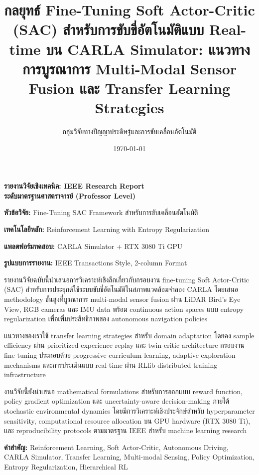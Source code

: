 \documentclass[10pt,a4paper,twocolumn]{article}
\title{\textbf{กลยุทธ์ Fine-Tuning Soft Actor-Critic (SAC) สำหรับการขับขี่อัตโนมัติแบบ Real-time บน CARLA Simulator: แนวทางการบูรณาการ Multi-Modal Sensor Fusion และ Transfer Learning Strategies}}
\author{กลุ่มวิจัยทางปัญญาประดิษฐ์และการขับเคลื่อนอัตโนมัติ}
\date{\today}
\begin{document}
\maketitle

\thispagestyle{empty}

\begin{center}
    \vspace{2cm}
    \textbf{\large รายงานวิจัยเชิงเทคนิค: IEEE Research Report} \\
    \vspace{1cm}
    \textbf{ระดับมาตรฐานศาสตราจารย์ (Professor Level)} \\
    \vspace{0.5cm}
    
    \begin{minipage}{0.48\textwidth}
        \textbf{หัวข้อวิจัย:} Fine-Tuning SAC Framework สำหรับการขับเคลื่อนอัตโนมัติ
        
        \vspace{0.3cm}
        \textbf{เทคโนโลยีหลัก:} Reinforcement Learning with Entropy Regularization
        
        \vspace{0.3cm}
        \textbf{แพลตฟอร์มทดสอบ:} CARLA Simulator + RTX 3080 Ti GPU
        
        \vspace{0.3cm}
        \textbf{รูปแบบการรายงาน:} IEEE Transactions Style, 2-column Format
    \end{minipage}
\end{center}

\vfill

\begin{abstract*}
รายงานวิจัยฉบับนี้นำเสนอการวิเคราะห์เชิงลึกเกี่ยวกับกรอบงาน fine-tuning Soft Actor-Critic (SAC) สำหรับการประยุกต์ใช้ระบบขับขี่อัตโนมัติในสภาพแวดล้อมจำลอง CARLA โดยเสนอ methodology ขั้นสูงที่บูรณาการ multi-modal sensor fusion ผ่าน LiDAR Bird's Eye View, RGB cameras และ IMU data พร้อม continuous action spaces แบบ entropy regularization เพื่อเพิ่มประสิทธิภาพของ autonomous navigation policies

แนวทางของเราใช้ transfer learning strategies สำหรับ domain adaptation โดยคง sample efficiency ผ่าน prioritized experience replay และ twin-critic architecture กรอบงาน fine-tuning ประกอบด้วย progressive curriculum learning, adaptive exploration mechanisms และการประเมินแบบ real-time ผ่าน RLlib distributed training infrastructure

งานวิจัยนี้ยังนำเสนอ mathematical formulations สำหรับการออกแบบ reward function, policy gradient optimization และ uncertainty-aware decision-making ภายใต้ stochastic environmental dynamics โดยมีการวิเคราะห์เชิงประจักษ์สำหรับ hyperparameter sensitivity, computational resource allocation บน GPU hardware (RTX 3080 Ti), และ reproducibility protocols ตามมาตรฐาน IEEE สำหรับ machine learning research

\textbf{คำสำคัญ:} Reinforcement Learning, Soft Actor-Critic, Autonomous Driving, CARLA Simulator, Transfer Learning, Multi-modal Sensing, Policy Optimization, Entropy Regularization, Hierarchical RL
\end{abstract*}
\end{document}
